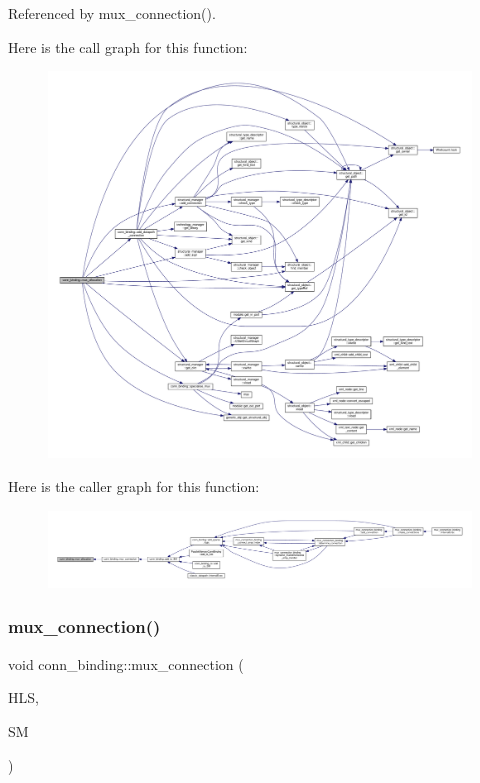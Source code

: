 Referenced by mux\+\_\+connection().

Here is the call graph for this function\+:
\nopagebreak
\begin{figure}[H]
\begin{center}
\leavevmode
\includegraphics[width=350pt]{d2/db1/classconn__binding_a58f8b4130f06326232baabc4cf18730e_cgraph}
\end{center}
\end{figure}
Here is the caller graph for this function\+:
\nopagebreak
\begin{figure}[H]
\begin{center}
\leavevmode
\includegraphics[width=350pt]{d2/db1/classconn__binding_a58f8b4130f06326232baabc4cf18730e_icgraph}
\end{center}
\end{figure}
\mbox{\label{classconn__binding_ab815fc2d481fffaa79d9659e3808616b}} 
\subsubsection{\texorpdfstring{mux\+\_\+connection()}{mux\_connection()}}
{\footnotesize\ttfamily void conn\+\_\+binding\+::mux\+\_\+connection (\begin{DoxyParamCaption}\item[{const \hyperlink{hls_8hpp_a75d0c73923d0ddfa28c4843a802c73a7}{hls\+Ref}}]{H\+LS,  }\item[{const \hyperlink{structural__manager_8hpp_ab3136f0e785d8535f8d252a7b53db5b5}{structural\+\_\+manager\+Ref}}]{SM }\end{DoxyParamCaption})\hspace{0.3cm}{\ttfamily [protected]}}




